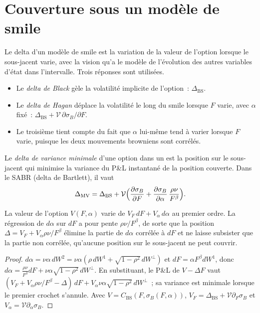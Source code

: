 \section{Couverture sous un modèle de smile}

Le delta d'un modèle de smile est la variation de la valeur de l'option lorsque le sous-jacent varie, avec la vision
qu'a le modèle de l'évolution des autres variables d'état dans l'intervalle. Trois réponses sont utilisées.

\begin{itemize}
\item Le \emph{delta de Black} gèle la volatilité implicite de l'option~: $\Delta_{\mathrm{BS}}$.
\item Le \emph{delta de Hagan} déplace la volatilité le long du smile lorsque $F$ varie, avec $\alpha$ fixé~:
$\Delta_{\mathrm{BS}}+\mathcal V\,\partial\sigma_B/\partial F$.
\item Le troisième tient compte du fait que $\alpha$ lui-même tend à varier lorsque $F$ varie, puisque les deux
mouvements browniens sont corrélés.
\end{itemize}

\begin{definition}\label{def:dv:sabr-and-smile-dynamics:mvdelta}
Le \emph{delta de variance minimale} d'une option dans un 
est la position sur le sous-jacent qui minimise la variance du P\&L instantané de la position couverte.
Dans le SABR (delta de Bartlett), il vaut
\[
\Delta_{\mathrm{MV}}=\Delta_{\mathrm{BS}}+\mathcal V\Bigl(\frac{\partial\sigma_B}{\partial F}
+\frac{\partial\sigma_B}{\partial\alpha}\,\frac{\rho\nu}{F^{\beta}}\Bigr).
\]
\end{definition}

\begin{proposition}\label{prop:dv:sabr-and-smile-dynamics:mv}
La valeur de l'option $V(F,\alpha)$ varie de $V_F\,dF+V_\alpha\,d\alpha$ au premier ordre. La régression de
$d\alpha$ sur $dF$ a pour pente $\rho\nu/F^\beta$, de sorte que la position $\Delta=V_F+V_\alpha\rho\nu/F^\beta$ élimine
la partie de $d\alpha$ corrélée à $dF$ et ne laisse subsister que la partie non corrélée, qu'aucune position sur
le sous-jacent ne peut couvrir.
\end{proposition}
\begin{proof}
$d\alpha=\nu\alpha\,dW^2=\nu\alpha(\rho\,dW^1+\sqrt{1-\rho^2}\,dW^\perp)$ et $dF=\alpha F^\beta dW^1$, donc
$d\alpha=\frac{\rho\nu}{F^\beta}dF+\nu\alpha\sqrt{1-\rho^2}\,dW^\perp$. En substituant, le P\&L de
$V-\Delta F$ vaut $(V_F+V_\alpha\rho\nu/F^\beta-\Delta)\,dF+V_\alpha\nu\alpha\sqrt{1-\rho^2}\,dW^\perp$~; sa
variance est minimale lorsque le premier crochet s'annule. Avec $V=C_{\mathrm{BS}}(F,\sigma_B(F,\alpha))$,
$V_F=\Delta_{\mathrm{BS}}+\mathcal V\partial_F\sigma_B$ et $V_\alpha=\mathcal V\partial_\alpha\sigma_B$.
\end{proof}

